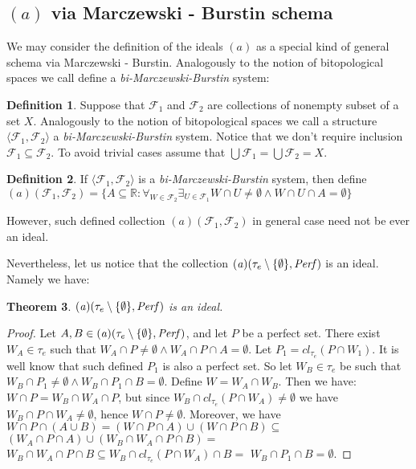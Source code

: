 \documentclass[12pt]{amsart}
\theoremstyle{plain}
\newtheorem{theorem}{Theorem}[section]
\theoremstyle{definition}
\newtheorem{definition}[theorem]{Definition}
\theoremstyle{remark}
\newcommand{\cl}{\mathit{cl}}
\newcommand{\Perf}{{\it Perf}}
\newcommand{\real}{\mathbb{R}}
\newcommand{\cF}{{\mathcal F}}
\newcommand{\aideal}{\mathit{(a)}}
\newcommand{\biMB}{bi-Marczewski-Burstin}
\begin{document}
\subsection{$\aideal$ via Marczewski - Burstin schema}

We may consider the definition of the ideals $\aideal$
as a special kind of general schema via Marczewski - Burstin.
Analogously to the notion of bitopological spaces we call define
a {\it\biMB{}} system:

\begin{definition}
Suppose that $\cF_1$ and $\cF_2$ are collections of nonempty
subset of a set $X$. 
Analogously to the notion of bitopological spaces we call a structure
$\langle \cF_1, \cF_2 \rangle$ a {\it\biMB{}} system.
Notice that we don't require inclusion $\cF_1 \subseteq \cF_2$.
To avoid trivial cases assume that $\bigcup \cF_1 = \bigcup \cF_2 = X$.
\end{definition}

\begin{definition}
If $\langle \cF_1, \cF_2 \rangle$ is a {\it\biMB{}} system,
then define 
$\aideal(\cF_1, \cF_2) = \lbrace A \subseteq \real\colon 
\forall_{W\in \cF_2} \exists_{U \in \cF_1}
W \cap U \not= \emptyset \wedge W \cap U \cap A = \emptyset
\rbrace$ 
\end{definition}

However, such defined collection $\aideal(\cF_1, \cF_2)$
in general case need not be ever an ideal.

Nevertheless, let us notice that the collection
$\aideal(\tau_e\setminus\lbrace\emptyset\rbrace, \Perf)$ is an ideal. Namely we have:

\begin{theorem}
$\aideal(\tau_e\setminus\lbrace\emptyset\rbrace, \Perf)$ is an ideal.
\end{theorem}

\begin{proof}
Let $A, B \in \aideal(\tau_e\setminus\lbrace\emptyset\rbrace, \Perf)$,
and let $P$ be a perfect set. 
There exist $W_A \in \tau_e$ such that 
$W_A \cap P \not= \emptyset \wedge W_A \cap P \cap A = \emptyset$.
Let $P_1 = \cl_{\tau_e}(P \cap W_1)$. It is well know that such defined
$P_1$ is also a perfect set. So let $W_B \in \tau_e$ 
be such that 
$W_B \cap P_1 \not= \emptyset \wedge W_B \cap P_1 \cap B = \emptyset$.
Define $W = W_A \cap W_B$. Then we have:
$W \cap P = W_B \cap W_A \cap P$, 
but since $W_B \cap \cl_{\tau_e}(P \cap W_A) \not= \emptyset$
we have $W_B \cap P \cap W_A \not= \emptyset$,
hence $W \cap P \not= \emptyset$.
Moreover, we have
$W \cap P \cap (A \cup B) = (W \cap P \cap A) \cup (W \cap P \cap B) \subseteq$
$(W_A \cap P \cap A) \cup (W_B \cap W_A \cap P \cap B) =$
$W_B \cap W_A \cap P \cap B \subseteq W_B \cap \cl_{\tau_e} (P \cap W_A) \cap B =$
$W_B \cap P_1 \cap B = \emptyset$.
\end{proof}
\end{document}
